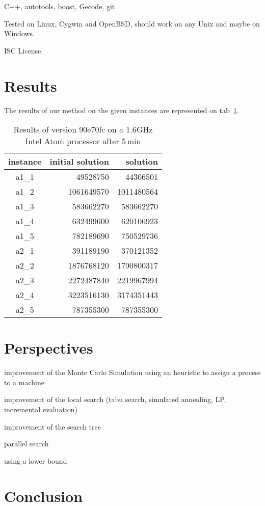 \documentclass[a4paper,twocolumn]{article}
\begin{document}
C++, autotools, boost, Gecode, git

Tested on Linux, Cygwin and OpenBSD, should work on any Unix and maybe
on Windows.

ISC License.

\section{Results}

The results of our method on the given instances are represented on
tab~\ref{tab:results}.

\begin{table}
  \centering
  \label{tab:results}
  \caption{Results of version 90e70fc on a 1.6GHz Intel Atom processor
    after 5\,min}
  \begin{tabular}{|c|r|r|}
    \hline
    instance & initial solution & solution\\
    \hline
    a1\_1 &   49528750 &   44306501\\
    a1\_2 & 1061649570 & 1011480564\\
    a1\_3 &  583662270 &  583662270\\
    a1\_4 &  632499600 &  620106923\\
    a1\_5 &  782189690 &  750529736\\
    a2\_1 &  391189190 &  370121352\\
    a2\_2 & 1876768120 & 1790800317\\
    a2\_3 & 2272487840 & 2219967994\\
    a2\_4 & 3223516130 & 3174351443\\
    a2\_5 &  787355300 &  787355300\\
    \hline
  \end{tabular}
\end{table}

\section{Perspectives}

improvement of the Monte Carlo Simulation using an heuristic to assign
a process to a machine

improvement of the local search (tabu search, simulated annealing, LP,
incremental evaluation)

improvement of the search tree

parallel search

using a lower bound

\section{Conclusion}


\end{document}
